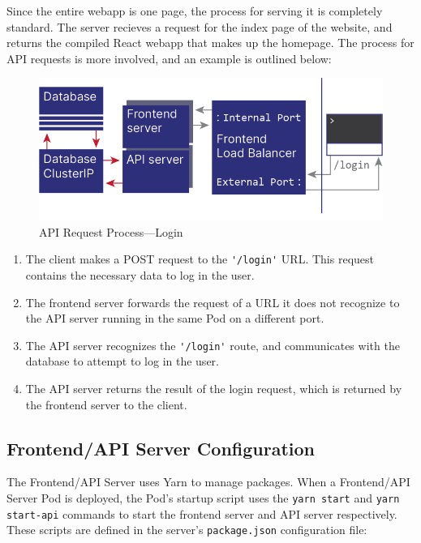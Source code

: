 \documentclass[12pt]{article}
\begin{document}
Since the entire webapp is one page, the process for serving it is
completely standard.  The server recieves a request for the index page
of the website, and returns the compiled React webapp that makes up
the homepage.  The process for API requests is more involved, and an
example is outlined below:

\begin{figure}[h!]

  \includegraphics[scale=1]{login_request}
  \centering
  \caption{API Request Process---Login}
  \label{rr:detailed}
\end{figure}

\begin{enumerate}
\item The client makes a POST request to the \lstinline{'/login'} URL.
  This request contains the necessary data to log in the user.
\item The frontend server forwards the request of a URL it does not
  recognize to the API server running in the same Pod on a different
  port.
\item The API server recognizes the \lstinline{'/login'} route, and
  communicates with the database to attempt to log in the user.
\item The API server returns the result of the login request, which is
  returned by the frontend server to the client.
\end{enumerate}

\subsection{Frontend/API Server Configuration}

The Frontend/API Server uses Yarn \cite{yarn} to manage packages.
When a Frontend/API Server Pod is deployed, the Pod's startup script
uses the \lstinline{yarn start} and \lstinline{yarn start-api}
commands to start the frontend server and API server respectively.
These scripts are defined in the server's \lstinline{package.json}
configuration file:
\end{document}
